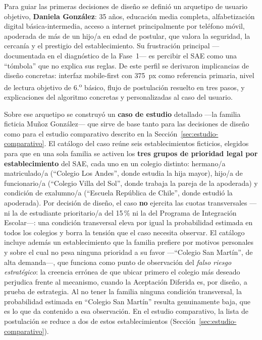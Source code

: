 Para guiar las primeras decisiones de diseño se definió un arquetipo de usuario objetivo, \textbf{Daniela González}: 35 años, educación media completa, alfabetización digital básica-intermedia, acceso a internet principalmente por teléfono móvil, apoderada de más de un hijo/a en edad de postular, que valora la seguridad, la cercanía y el prestigio del establecimiento. Su frustración principal ---documentada en el diagnóstico de la Fase~1--- es percibir el SAE como una ``tómbola'' que no explica sus reglas. De este perfil se derivaron implicancias de diseño concretas: interfaz mobile-first con 375~px como referencia primaria, nivel de lectura objetivo de 6.\textsuperscript{o} básico, flujo de postulación resuelto en tres pasos, y explicaciones del algoritmo concretas y personalizadas al caso del usuario.

Sobre ese arquetipo se construyó un \textbf{caso de estudio} detallado —la familia ficticia Muñoz González— que sirve de base tanto para las decisiones de diseño como para el estudio comparativo descrito en la Sección~\ref{sec:estudio-comparativo}. El catálogo del caso reúne seis establecimientos ficticios, elegidos para que en una sola familia se activen los \textbf{tres grupos de prioridad legal por establecimiento} del SAE, cada uno en un colegio distinto: hermano/a matriculado/a (``Colegio Los Andes'', donde estudia la hija mayor), hijo/a de funcionario/a (``Colegio Villa del Sol'', donde trabaja la pareja de la apoderada) y condición de exalumno/a (``Escuela República de Chile'', donde estudió la apoderada). Por decisión de diseño, el caso \textbf{no} ejercita las cuotas transversales —ni la de estudiante prioritario/a del 15\,\% ni la del Programa de Integración Escolar—: una condición transversal eleva por igual la probabilidad estimada en todos los colegios y borra la tensión que el caso necesita observar. El catálogo incluye además un establecimiento que la familia prefiere por motivos personales y sobre el cual no pesa ninguna prioridad a su favor —``Colegio San Martín'', de alta demanda—, que funciona como punto de observación del \emph{falso riesgo estratégico}: la creencia errónea de que ubicar primero el colegio más deseado perjudica frente al mecanismo, cuando la Aceptación Diferida es, por diseño, a prueba de estrategia. Al no tener la familia ninguna condición transversal, la probabilidad estimada en ``Colegio San Martín'' resulta genuinamente baja, que es lo que da contenido a esa observación. En el estudio comparativo, la lista de postulación se reduce a dos de estos establecimientos (Sección~\ref{sec:estudio-comparativo}).

